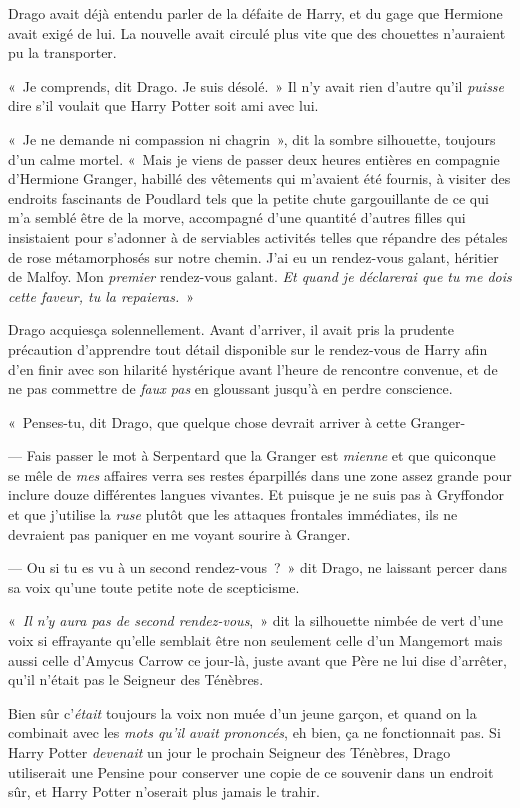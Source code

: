 Drago avait déjà entendu parler de la défaite de Harry, et du gage que Hermione avait exigé de lui. La nouvelle avait circulé plus vite que des chouettes n'auraient pu la transporter.

«~Je comprends, dit Drago. Je suis désolé.~» Il n'y avait rien d'autre qu'il \emph{puisse} dire s'il voulait que Harry Potter soit ami avec lui.

«~Je ne demande ni compassion ni chagrin~», dit la sombre silhouette, toujours d'un calme mortel. «~Mais je viens de passer deux heures entières en compagnie d'Hermione Granger, habillé des vêtements qui m'avaient été fournis, à visiter des endroits fascinants de Poudlard tels que la petite chute gargouillante de ce qui m'a semblé être de la morve, accompagné d'une quantité d'autres filles qui insistaient pour s'adonner à de serviables activités telles que répandre des pétales de rose métamorphosés sur notre chemin. J'ai eu un rendez-vous galant, héritier de Malfoy. Mon \emph{premier} rendez-vous galant. \emph{Et quand je déclarerai que tu me dois cette faveur, tu la repaieras.}~»

Drago acquiesça solennellement. Avant d'arriver, il avait pris la prudente précaution d'apprendre tout détail disponible sur le rendez-vous de Harry afin d'en finir avec son hilarité hystérique avant l'heure de rencontre convenue, et de ne pas commettre de \emph{faux pas} en gloussant jusqu'à en perdre conscience.

«~Penses-tu, dit Drago, que quelque chose devrait arriver à cette Granger-

--- Fais passer le mot à Serpentard que la Granger est \emph{mienne} et que quiconque se mêle de \emph{mes} affaires verra ses restes éparpillés dans une zone assez grande pour inclure douze différentes langues vivantes. Et puisque je ne suis pas à Gryffondor et que j'utilise la \emph{ruse} plutôt que les attaques frontales immédiates, ils ne devraient pas paniquer en me voyant sourire à Granger.

--- Ou si tu es vu à un second rendez-vous~?~» dit Drago, ne laissant percer dans sa voix qu'une toute petite note de scepticisme.

«~\emph{Il n'y aura pas de second rendez-vous},~» dit la silhouette nimbée de vert d'une voix si effrayante qu'elle semblait être non seulement celle d'un Mangemort mais aussi celle d'Amycus Carrow ce jour-là, juste avant que Père ne lui dise d'arrêter, qu'il n'était pas le Seigneur des Ténèbres.

Bien sûr c'\emph{était} toujours la voix non muée d'un jeune garçon, et quand on la combinait avec les \emph{mots qu'il avait prononcés}, eh bien, ça ne fonctionnait pas. Si Harry Potter \emph{devenait} un jour le prochain Seigneur des Ténèbres, Drago utiliserait une Pensine pour conserver une copie de ce souvenir dans un endroit sûr, et Harry Potter n'oserait plus jamais le trahir.

